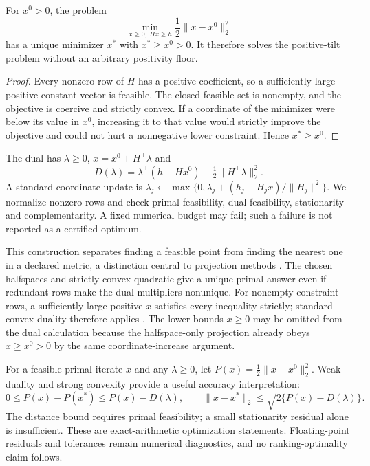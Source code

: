 \begin{theorem}\label{thm:projection}
For $x^0>0$, the problem
\begin{equation}\label{eq:projection}
\min_{x\ge0,\ Hx\ge h}\frac12\|x-x^0\|_2^2
\end{equation}
has a unique minimizer $x^*$ with $x^*\ge x^0>0$. It therefore solves the positive-tilt problem without an arbitrary positivity floor.
\end{theorem}
\begin{proof}
Every nonzero row of $H$ has a positive coefficient, so a sufficiently large positive constant vector is feasible. The closed feasible set is nonempty, and the objective is coercive and strictly convex. If a coordinate of the minimizer were below its value in $x^0$, increasing it to that value would strictly improve the objective and could not hurt a nonnegative lower constraint. Hence $x^*\ge x^0$.
\end{proof}

The dual has $\lambda\ge0$, $x=x^0+H^\top\lambda$ and
\[
D(\lambda)=\lambda^\top(h-Hx^0)
-\tfrac12\|H^\top\lambda\|_2^2.
\]
A standard coordinate update is
$\lambda_j\leftarrow\max\{0,\lambda_j+(h_j-H_jx)/\|H_j\|^2\}$.
We normalize nonzero rows and check primal feasibility, dual feasibility, stationarity and complementarity. A fixed numerical budget may fail; such a failure is not reported as a certified optimum.

This construction separates finding a feasible point from finding the nearest one in a declared metric, a distinction central to projection methods \cite{projection,dykstra}. The chosen halfspaces and strictly convex quadratic give a unique primal answer even if redundant rows make the dual multipliers nonunique. For nonempty constraint rows, a sufficiently large positive $x$ satisfies every inequality strictly; standard convex duality therefore applies \cite{convex}. The lower bounds $x\ge0$ may be omitted from the dual calculation because the halfspace-only projection already obeys $x\ge x^0>0$ by the same coordinate-increase argument.

For a feasible primal iterate $x$ and any $\lambda\ge0$, let $P(x)=\tfrac12\|x-x^0\|_2^2$. Weak duality and strong convexity provide a useful accuracy interpretation:
\begin{equation}\label{eq:gap-bound}
0\le P(x)-P(x^*)\le P(x)-D(\lambda),\qquad
\|x-x^*\|_2\le\sqrt{2\{P(x)-D(\lambda)\}}.
\end{equation}
The distance bound requires primal feasibility; a small stationarity residual alone is insufficient. These are exact-arithmetic optimization statements. Floating-point residuals and tolerances remain numerical diagnostics, and no ranking-optimality claim follows.

